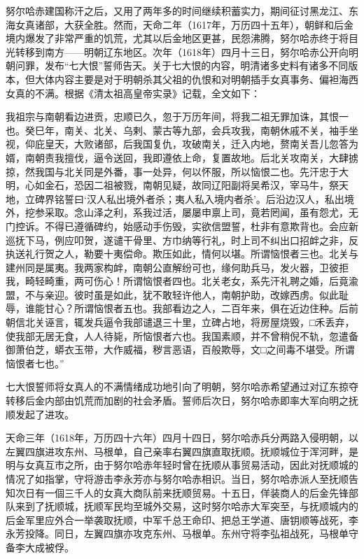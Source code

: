 努尔哈赤建国称汗之后，又用了两年多的时间继续积蓄实力，期间征讨黑龙江、东海女真诸部，大获全胜。然而，天命二年（1617年，万历四十五年），朝鲜和后金境内爆发了非常严重的饥荒，尤其以后金地区更甚，民怨沸腾，努尔哈赤终于将目光转移到南方——明朝辽东地区。次年（1618年）四月十三日，努尔哈赤公开向明朝问罪，发布“七大恨”誓师告天。关于七大恨的内容，明清诸多史料有诸多不同版本，但大体内容主要是对于明朝杀其父祖的仇恨和对明朝插手女真事务、偏袒海西女真的不满。根据《清太祖高皇帝实录》记载，全文如下：

我祖宗与南朝看边进贡，忠顺已久，忽于万历年间，将我二祖无罪加诛，其恨一也。癸巳年，南关、北关、乌剌、蒙古等九部，会兵攻我，南朝休戚不关，袖手坐视，仰庇皇天，大败诸部，后我国复仇，攻破南关，迁入内地，赘南关吾儿忽答为婿，南朝责我擅伐，逼令送回，我即遵依上命，复置故地。后北关攻南关，大肆掳掠，然我国与北关同是外番，事一处异，何以怀服，所以恼恨二也。先汗忠于大明，心如金石，恐因二祖被戮，南朝见疑，故同辽阳副将吴希汉，宰马牛，祭天地，立碑界铭誓曰‘汉人私出境外者杀；夷人私入境内者杀’。后沿边汉人，私出境外，挖参采取。念山泽之利，系我过活，屡屡申禀上司，竟若罔闻，虽有怨尤，无门控诉。不得已遵循碑约，始感动手伤毁，实欲信盟誓，杜非有意欺背也。会应新巡抚下马，例应叩贺，遂谴干骨里、方巾纳等行礼，时上司不纠出口招衅之非，反执送礼行贺之人，勒要十夷偿命。欺压如此，情何以堪。所谓恼恨者三也。北关与建州同是属夷。我两家构衅，南朝公直解纷可也，缘何助兵马，发火器，卫彼拒我，畸轻畸重，两可伤心！所谓恼恨者四也。北关老女，系先汗礼聘之婚，后竟渝盟，不与亲迎。彼时虽是如此，犹不敢轻许他人，南朝护助，改嫁西虏。似此耻辱，谁能甘心？所谓恼恨者五也。我部看边之人，二百年来，俱在近边住种。后前朝信北关诬言，辄发兵逼令我部谴退三十里，立碑占地，将房屋烧毁，□禾丢弃，使我部无居无食，人人待毙，所恼恨者六也。我国素顺，并不曾稍倪不轨，忽遣备御萧伯芝，蟒衣玉带，大作威福，秽言恶语，百般欺辱，文□之间毒不堪受。所谓恼恨者七也。”

七大恨誓师将女真人的不满情绪成功地引向了明朝，努尔哈赤希望通过对辽东掠夺转移后金内部由饥荒而加剧的社会矛盾。誓师后次日，努尔哈赤即率大军向明之抚顺发起了进攻。

天命三年（1618年，万历四十六年）四月十四日，努尔哈赤兵分两路入侵明朝，以左翼四旗进攻东州、马根单，自己亲率右翼四旗直取抚顺。抚顺城位于浑河畔，是明与女真互市之所，由于努尔哈赤年轻时曾在抚顺从事贸易活动，因此对抚顺城的情况了如指掌，守将游击李永芳亦与努尔哈赤相识。当日，努尔哈赤派人至抚顺告知次日有一個三千人的女真大商队前来抚顺贸易。十五日，佯装商人的后金先锋部队来到了抚顺城，抚顺军民均至城外交易，这时努尔哈赤大军突至，与抚顺城内的后金军里应外合一举袭取抚顺，中军千总王命印、把总王学道、唐钥顺等战死，李永芳投降。同日，左翼四旗亦攻克东州、马根单。东州守将李弘祖战死，马根单守备李大成被俘。


